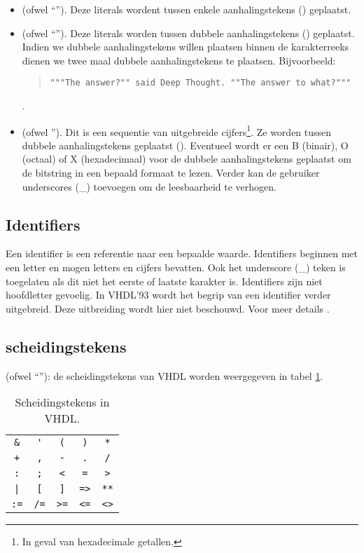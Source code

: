 \begin{itemize}
  \item {} (ofwel ``''). Deze literals wordent tussen enkele aanhalingstekens () geplaatst.
  \item {} (ofwel ``''). Deze literals worden tussen dubbele aanhalingstekens () geplaatst. Indien we dubbele aanhalingstekens willen plaatsen binnen de karakterreeks dienen we twee maal dubbele aanhalingstekens te plaatsen. Bijvoorbeeld:
\begin{quote}\verb+"""The answer?"" said Deep Thought. ""The answer to what?"""+\cite[\S25]{Adams81BOOK54}\end{quote}.
  \item {} (ofwel ''). Dit is een sequentie van uitgebreide cijfers\footnote{In geval van hexadecimale getallen.}. Ze worden tussen dubbele aanhalingstekens geplaatst (). Eventueel wordt er een B (binair), O (octaal) of X (hexadecimaal) voor de dubbele aanhalingstekens geplaatst om de bitstring in een bepaald formaat te lezen. Verder kan de gebruiker underscores (\_) toevoegen om de leesbaarheid te verhogen.
 \end{itemize}
\subsection{Identifiers}
Een identifier is een referentie naar een bepaalde waarde. Identifiers beginnen met een letter en mogen letters en cijfers bevatten. Ook het underscore (\_) teken is toegelaten als dit niet het eerste of laatste karakter is. Identifiers zijn niet hoofdletter gevoelig. In VHDL'93 wordt het begrip van een identifier verder uitgebreid. Deze uitbreiding wordt hier niet beschouwd. Voor meer details \cite[p. 4]{hardi00}.
\subsection{scheidingstekens}
 (ofwel ``''): de
scheidingstekens van VHDL worden weergegeven in tabel \ref{tbl:vHDLdelimiters}.
\begin{table}[hbt]
\centering
\begin{tabular}{ccccc}
\verb+&+&\verb+'+&\verb+(+&\verb+)+&\verb+*+\\
\verb/+/&\verb+,+&\verb+-+&\verb+.+&\verb+/+\\
\verb+:+&\verb+;+&\verb+<+&\verb+=+&\verb+>+\\
\verb+|+&\verb+[+&\verb+]+&\verb+=>+&\verb+**+\\
\verb+:=+&\verb+/=+&\verb+>=+&\verb+<=+&\verb+<>+
\end{tabular}
\caption{Scheidingstekens in VHDL.}
\label{tbl:vHDLdelimiters}
\end{table}
